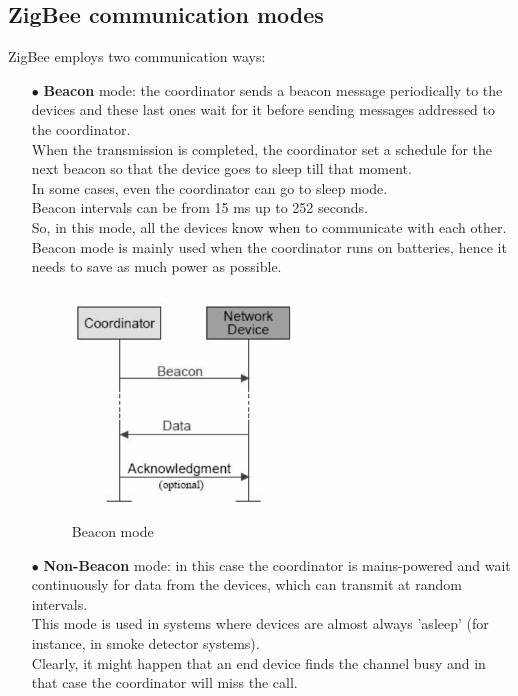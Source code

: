 \documentclass[12pt]{report}
\begin{document}
{\subsection{ZigBee communication modes}
\bigskip
ZigBee employs two communication ways:
\bigskip
\begin{itemize}
\setlength{\itemindent}{+4mm}
\item[$\bullet$] \textbf{Beacon} mode: the coordinator sends a beacon message periodically to the devices and these last ones wait for it before sending messages addressed to the coordinator.\\
When the transmission is completed, the coordinator set a schedule for the next beacon so that the device goes to sleep till that moment.\\
In some cases, even the coordinator can go to sleep mode.\\
Beacon intervals can be from 15 ms up to 252 seconds.\\
So, in this mode, all the devices know when to communicate with each other.\\
Beacon mode is mainly used when the coordinator runs on batteries, hence it needs to save as much power as possible.

\begin{figure}[H]
\includegraphics[width=6cm,height=6cm,keepaspectratio]{zigbee_beaconmode}
\centering
\caption{Beacon mode}
\end{figure}

\item[$\bullet$] \textbf{Non-Beacon} mode: in this case the coordinator is mains-powered and wait continuously for data from the devices, which can transmit at random intervals.\\
This mode is used in systems where devices are almost always 'asleep' (for instance, in smoke detector systems).\\
Clearly, it might happen that an end device finds the channel busy and in that case the coordinator will miss the call.


\end{itemize}}
\end{document}
